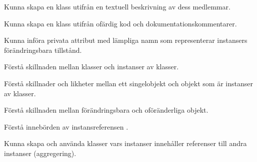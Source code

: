 

\item Kunna skapa en klass utifrån en textuell beskrivning av dess medlemmar.
\item Kunna skapa en klass utifrån ofärdig kod och dokumentationskommentarer.
\item Kunna införa privata attribut med lämpliga namn som representerar instansers förändringsbara tillstånd.
\item Förstå skillnaden mellan klasser och instanser av klasser.
\item Förstå skillnader och likheter mellan ett singelobjekt och objekt som är instanser av klasser.
\item Förstå skillnaden mellan förändringsbara och oföränderliga objekt.
\item Förstå innebörden av instansreferensen .
\item Kunna skapa och använda klasser vars instanser innehåller referenser till andra instanser (aggregering).